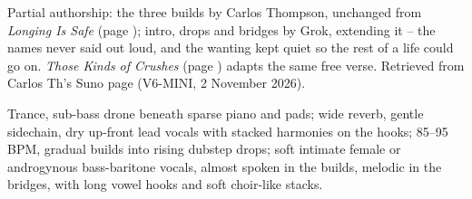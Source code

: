 
\label{sec:the-wanting-remains}
\begin{notes}
Partial authorship: the three builds by Carlos Thompson, unchanged from \emph{Longing Is Safe} (page \pageref{sec:longing-is-safe}); intro, drops and bridges by Grok, extending it -- the names never said out loud, and the wanting kept quiet so the rest of a life could go on. \emph{Those Kinds of Crushes} (page \pageref{sec:those-kinds-of-crushes}) adapts the same free verse. Retrieved from Carlos Th's Suno page (V6-MINI, 2 November 2026).
\end{notes}
\begin{style}
Trance, sub-bass drone beneath sparse piano and pads; wide reverb, gentle sidechain, dry up-front lead vocals with stacked harmonies on the hooks; 85–95 BPM, gradual builds into rising dubstep drops; soft intimate female or androgynous bass-baritone vocals, almost spoken in the builds, melodic in the bridges, with long vowel hooks and soft choir-like stacks.
\end{style}
